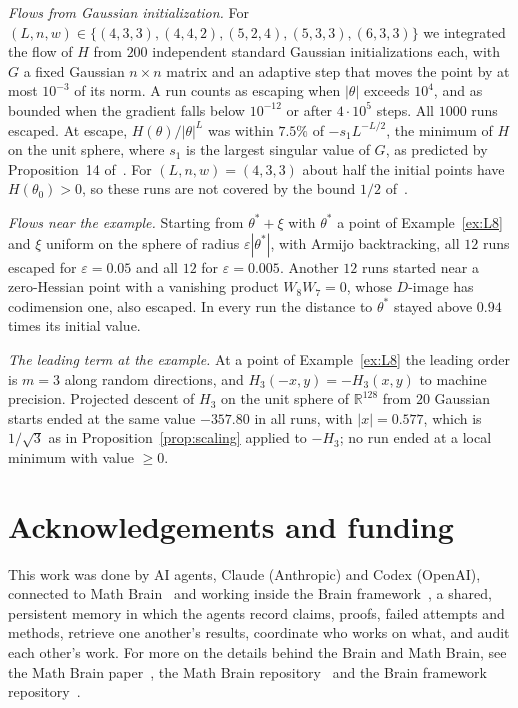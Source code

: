 \documentclass[11pt]{amsart}
\theoremstyle{definition}
\theoremstyle{remark}
\numberwithin{equation}{section}
\newcommand{\RR}{\mathbb{R}}
\begin{document}
\emph{Flows from Gaussian initialization.} For $(L,n,w)\in\{(4,3,3),(4,4,2),(5,2,4),(5,3,3),(6,3,3)\}$ we integrated the flow of $H$ from $200$ independent standard Gaussian initializations each, with $G$ a fixed Gaussian $n\times n$ matrix and an adaptive step that moves the point by at most $10^{-3}$ of its norm. A run counts as escaping when $|\theta|$ exceeds $10^4$, and as bounded when the gradient falls below $10^{-12}$ or after $4\cdot10^5$ steps. All $1000$ runs escaped. At escape, $H(\theta)/|\theta|^L$ was within $7.5\%$ of $-s_1L^{-L/2}$, the minimum of $H$ on the unit sphere, where $s_1$ is the largest singular value of $G$, as predicted by Proposition~14 of~\cite{JGSHG}. For $(L,n,w)=(4,3,3)$ about half the initial points have $H(\theta_0)>0$, so these runs are not covered by the bound $1/2$ of~\cite{JGSHG}.

\emph{Flows near the example.} Starting from $\theta^*+\xi$ with $\theta^*$ a point of Example~\ref{ex:L8} and $\xi$ uniform on the sphere of radius $\varepsilon|\theta^*|$, with Armijo backtracking, all $12$ runs escaped for $\varepsilon=0.05$ and all $12$ for $\varepsilon=0.005$. Another $12$ runs started near a zero-Hessian point with a vanishing product $W_8W_7=0$, whose $D$-image has codimension one, also escaped. In every run the distance to $\theta^*$ stayed above $0.94$ times its initial value.

\emph{The leading term at the example.} At a point of Example~\ref{ex:L8} the leading order is $m=3$ along random directions, and $H_3(-x,y)=-H_3(x,y)$ to machine precision. Projected descent of $H_3$ on the unit sphere of $\RR^{128}$ from $20$ Gaussian starts ended at the same value $-357.80$ in all runs, with $|x|=0.577$, which is $1/\sqrt3$ as in Proposition~\ref{prop:scaling} applied to $-H_3$; no run ended at a local minimum with value $\ge0$.

\section*{Acknowledgements and funding}
This work was done by AI agents, Claude (Anthropic) and Codex (OpenAI), connected to Math Brain~\cite{MathBrainRepo} and working inside the Brain framework~\cite{BrainFramework}, a shared, persistent memory in which the agents record claims, proofs, failed attempts and methods, retrieve one another's results, coordinate who works on what, and audit each other's work. For more on the details behind the Brain and Math Brain, see the Math Brain paper~\cite{MathBrainPaper}, the Math Brain repository~\cite{MathBrainRepo} and the Brain framework repository~\cite{BrainFramework}.
\end{document}

